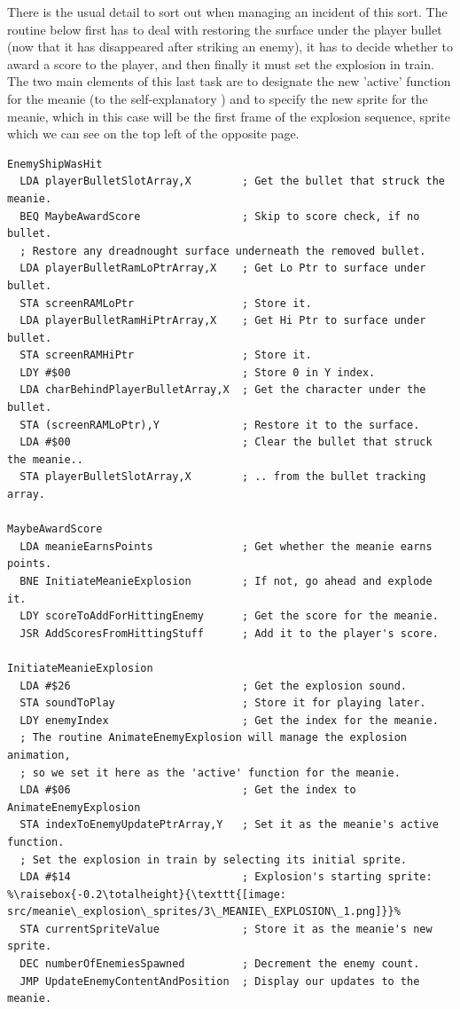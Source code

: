 There is the usual detail to sort out when managing an incident of this sort. The routine
below first has to deal with restoring the surface under the player bullet (now that
it has disappeared after striking an enemy), it has to decide whether to award a score to
the player, and then
finally it must set the explosion in train. The two main elements of this last task are to 
designate the new 'active' function for the meanie (to the self-explanatory
) and to specify the new sprite for the
meanie, which in this case will be the first frame of the explosion sequence, sprite 
which we can see on the top left of the opposite page.

\begin{lstlisting}[basicstyle=\scriptsize\ttfamily, escapechar=\%]
EnemyShipWasHit
  LDA playerBulletSlotArray,X        ; Get the bullet that struck the meanie.
  BEQ MaybeAwardScore                ; Skip to score check, if no bullet.
  ; Restore any dreadnought surface underneath the removed bullet.
  LDA playerBulletRamLoPtrArray,X    ; Get Lo Ptr to surface under bullet.
  STA screenRAMLoPtr                 ; Store it.
  LDA playerBulletRamHiPtrArray,X    ; Get Hi Ptr to surface under bullet.
  STA screenRAMHiPtr                 ; Store it.
  LDY #$00                           ; Store 0 in Y index.
  LDA charBehindPlayerBulletArray,X  ; Get the character under the bullet.
  STA (screenRAMLoPtr),Y             ; Restore it to the surface.
  LDA #$00                           ; Clear the bullet that struck the meanie..
  STA playerBulletSlotArray,X        ; .. from the bullet tracking array.

MaybeAwardScore   
  LDA meanieEarnsPoints              ; Get whether the meanie earns points.
  BNE InitiateMeanieExplosion        ; If not, go ahead and explode it.
  LDY scoreToAddForHittingEnemy      ; Get the score for the meanie.
  JSR AddScoresFromHittingStuff      ; Add it to the player's score.

InitiateMeanieExplosion
  LDA #$26                           ; Get the explosion sound.
  STA soundToPlay                    ; Store it for playing later.
  LDY enemyIndex                     ; Get the index for the meanie.
  ; The routine AnimateEnemyExplosion will manage the explosion animation,
  ; so we set it here as the 'active' function for the meanie.
  LDA #$06                           ; Get the index to AnimateEnemyExplosion
  STA indexToEnemyUpdatePtrArray,Y   ; Set it as the meanie's active function.
  ; Set the explosion in train by selecting its initial sprite.
  LDA #$14                           ; Explosion's starting sprite: %\raisebox{-0.2\totalheight}{\texttt{[image: src/meanie\_explosion\_sprites/3\_MEANIE\_EXPLOSION\_1.png]}}% 
  STA currentSpriteValue             ; Store it as the meanie's new sprite.
  DEC numberOfEnemiesSpawned         ; Decrement the enemy count.
  JMP UpdateEnemyContentAndPosition  ; Display our updates to the meanie.
\end{lstlisting}


